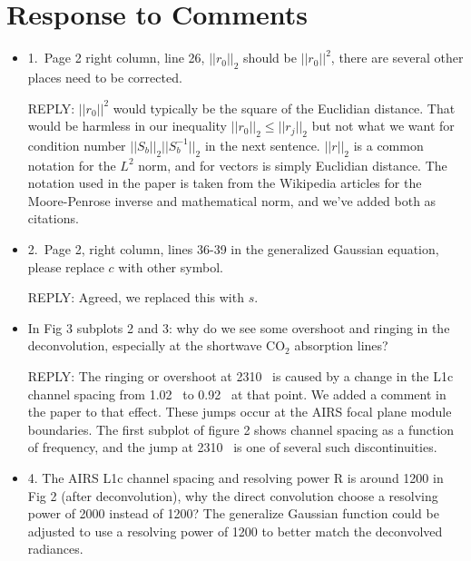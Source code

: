 \documentclass[11pt]{article}
\newcommand {\reply} {\mbox{\small REPLY}}
\begin{document}
\section{Response to Comments}

\begin{itemize}
  \item 1.~Page 2 right column, line 26, $||r_0||_2$ should be
    $||r_0||^2$, there are several other places need to be
    corrected.

    \reply: $||r_0||^2$ would typically be the square of the
    Euclidian distance.  That would be harmless in our inequality
    $||r_0||_2 \le ||r_j||_2$ but not what we want for condition
    number $||S_b||_2||S_b^{-1}||_2$ in the next sentence.
    $||r||_2$ is a common notation for the $L^2$ norm, and for
    vectors is simply Euclidian distance.  The notation used in the
    paper is taken from the Wikipedia articles for the Moore-Penrose
    inverse and mathematical norm, and we've added both as
    citations.


  \item 2.~Page 2, right column, lines 36-39 in the generalized
    Gaussian equation, please replace $c$ with other symbol.

    \reply: Agreed, we replaced this with $s$.

  \item In Fig 3 subplots 2 and 3: why do we see some overshoot
    and ringing in the deconvolution, especially at the shortwave
    CO$_2$ absorption lines?

    \reply: The ringing or overshoot at 2310~{\wn} is caused by a
    change in the L1c channel spacing from 1.02~{\wn} to 0.92~{\wn}
    at that point.  We added a comment in the paper to that effect.
    These jumps occur at the AIRS focal plane module boundaries.
    The first subplot of figure 2 shows channel spacing as a
    function of frequency, and the jump at 2310~{\wn} is one of
    several such discontinuities.  

  \item 4. The AIRS L1c channel spacing and resolving power R is
    around 1200 in Fig 2 (after deconvolution), why the direct
    convolution choose a resolving power of 2000 instead of 1200?
    The generalize Gaussian function could be adjusted to use a
    resolving power of 1200 to better match the deconvolved
    radiances.


\end{itemize}
\end{document}
